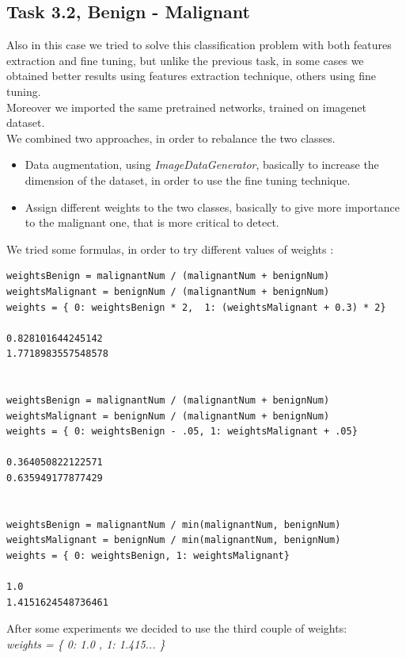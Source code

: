 \documentclass{article}
\begin{document}
\clearpage
\subsection{Task 3.2, Benign - Malignant}
Also in this case we tried to solve this classification problem with both features extraction and fine tuning, but unlike the previous task, in some cases we obtained better results using features extraction technique, others using fine tuning.\\
Moreover we imported the same pretrained networks, trained on imagenet dataset.\\
We combined two approaches, in order to rebalance the two classes.
\begin{itemize}
\item Data augmentation, using \textit{ImageDataGenerator}, basically to increase the dimension of the dataset, in order to use the fine tuning technique.
\item Assign different weights to the two classes, basically to give more importance to the malignant one, that is more critical to detect.
\end{itemize}
We tried some formulas, in order to try different values of weights :

\begin{verbatim}
weightsBenign = malignantNum / (malignantNum + benignNum)
weightsMalignant = benignNum / (malignantNum + benignNum) 
weights = { 0: weightsBenign * 2,  1: (weightsMalignant + 0.3) * 2}

0.828101644245142
1.7718983557548578


weightsBenign = malignantNum / (malignantNum + benignNum)
weightsMalignant = benignNum / (malignantNum + benignNum) 
weights = { 0: weightsBenign - .05, 1: weightsMalignant + .05}

0.364050822122571
0.635949177877429


weightsBenign = malignantNum / min(malignantNum, benignNum)
weightsMalignant = benignNum / min(malignantNum, benignNum) 
weights = { 0: weightsBenign, 1: weightsMalignant}

1.0
1.4151624548736461

\end{verbatim}
After some experiments we decided to use the third couple of weights:\\ \textit{weights = \{ 0: 1.0 ,   1: 1.415... \}}

\end{document}
